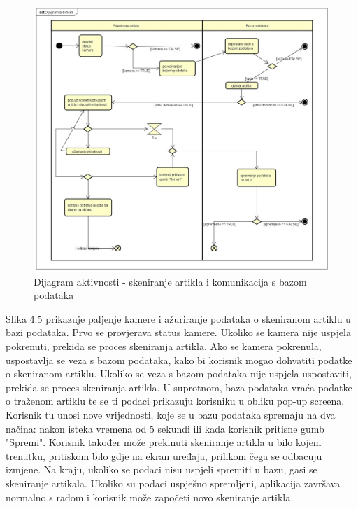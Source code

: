 			\begin{figure}[H]
				\centering
				\includegraphics[width=1.0\linewidth]{"slike/Dijagram aktivnosti"}
				\caption{Dijagram aktivnosti - skeniranje artikla i komunikacija s bazom podataka}
				\label{Slika 4.5}
			\end{figure}
			
			Slika 4.5 prikazuje paljenje kamere i ažuriranje podataka o skeniranom artiklu u bazi podataka. Prvo se provjerava status kamere. Ukoliko se kamera nije uspjela pokrenuti, prekida se proces skeniranja artikla. Ako se kamera pokrenula, uspostavlja se veza s bazom podataka, kako bi korisnik mogao dohvatiti podatke o skeniranom artiklu. Ukoliko se veza s bazom podataka nije uspjela uspostaviti, prekida se proces skeniranja artikla. U suprotnom, baza podataka vraća podatke o traženom artiklu te se ti podaci prikazuju korisniku u obliku pop-up screena. Korisnik tu unosi nove vrijednosti, koje se u bazu podataka spremaju na dva načina: nakon isteka vremena od 5 sekundi ili kada korisnik pritisne gumb "Spremi". Korisnik također može prekinuti skeniranje artikla u bilo kojem trenutku, pritiskom bilo gdje na ekran uređaja, prilikom čega se odbacuju izmjene. Na kraju, ukoliko se podaci nisu uspjeli spremiti u bazu, gasi se skeniranje artikala. Ukoliko su podaci uspješno spremljeni, aplikacija završava normalno s radom i korisnik može započeti novo skeniranje artikla.
			
			\eject
			
